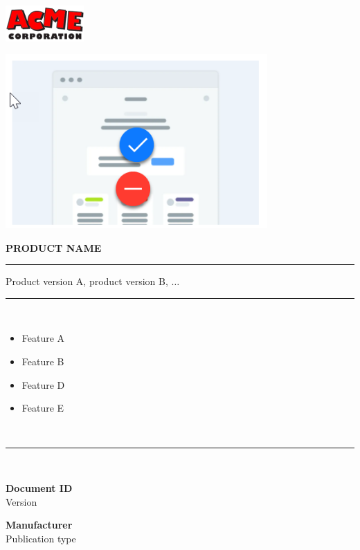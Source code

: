 \documentclass[oneside]{book}
\begin{document}
	\begin{titlepage}
		\begin{flushright}
			\includegraphics[width=3cm]{Acme-corp.png}
		\end{flushright}
		\vfil
		\begin{center}
			\includegraphics[width=10cm]{wireframe.png}
		\end{center}
		\vfil
		\Huge
		\textbf{\uppercase{product name}} \\
		\rule{\textwidth}{1pt}
		\Large
		Product version A, product version B, $\ldots$\\
		\rule{\textwidth}{1pt}\\[0.5em]
		\begin{minipage}{0.5\textwidth}
			\begin{itemize}
				\item Feature A
				\item Feature B
			\end{itemize}
		\end{minipage}
		\hfill
		\begin{minipage}{0.5\textwidth}
			\begin{flushright}
				\begin{itemize}
					\item Feature D
					\item Feature E
				\end{itemize}
			\end{flushright}
		\end{minipage}
		\\[0.5em]
		\rule{\textwidth}{1pt}\\[0.5em]
		\begin{minipage}{0.5\textwidth}
			\begin{flushleft}
				\textbf{Document ID}\\
				Version
			\end{flushleft}
		\end{minipage}
		\hfill
		\begin{minipage}{0.5\textwidth}
			\begin{flushright}
				\textbf{Manufacturer}\\Publication type
			\end{flushright}		
		\end{minipage}
	\end{titlepage}
\end{document}
